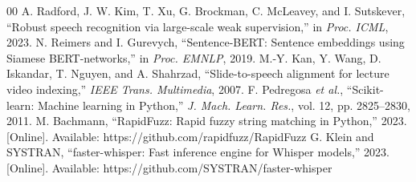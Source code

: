 \documentclass[conference,a4paper]{IEEEtran}
\begin{document}
\begin{thebibliography}{00}
 A. Radford, J. W. Kim, T. Xu, G. Brockman, C. McLeavey, and I. Sutskever, ``Robust speech recognition via large-scale weak supervision,'' in \emph{Proc. ICML}, 2023.
 N. Reimers and I. Gurevych, ``Sentence-BERT: Sentence embeddings using Siamese BERT-networks,'' in \emph{Proc. EMNLP}, 2019.
 M.-Y. Kan, Y. Wang, D. Iskandar, T. Nguyen, and A. Shahrzad, ``Slide-to-speech alignment for lecture video indexing,'' \emph{IEEE Trans. Multimedia}, 2007.
 F. Pedregosa \emph{et al.}, ``Scikit-learn: Machine learning in Python,'' \emph{J. Mach. Learn. Res.}, vol. 12, pp. 2825--2830, 2011.
 M. Bachmann, ``RapidFuzz: Rapid fuzzy string matching in Python,'' 2023. [Online]. Available: https://github.com/rapidfuzz/RapidFuzz
 G. Klein and SYSTRAN, ``faster-whisper: Fast inference engine for Whisper models,'' 2023. [Online]. Available: https://github.com/SYSTRAN/faster-whisper
\end{thebibliography}
\end{document}
